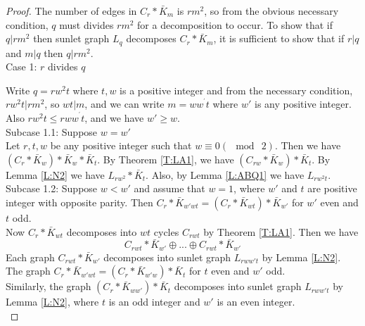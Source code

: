 \documentclass[12pt]{report}
\begin{document}
\begin{proof}
The number of edges in $C_{r}*\bar{K}_{m}$ is $rm^{2}$, so from the
obvious necessary condition, $q$ must divides $rm^{2}$ for a
decomposition to occur. To show that if $q|rm^{2}$ then sunlet graph
$L_{q}$ decomposes $C_{r}*\bar{K}_{m}$, it is sufficient to show
that if $r|q$ and $m|q$ then $q|rm^{2}$. \\
Case 1: $r$ divides $q$

Write $q=rw^{2}t$ where $t,w$ is a positive integer and from the necessary condition, $rw^{2}t|rm^{2}$, so $wt|m$, and we can write $m=ww^{^{\prime }}t$ where $w'$ is any positive integer. Also $%
rw^{2}t\leq rww^{^{\prime }}t$, and we have  $w'\geq w$.\\
Subcase  1.1: Suppose $w=w'$\\%
 Let $r,t,w$ be any positive integer such that $w\equiv 0(\mod \ 2)$. Then we have $(C_r*\bar{K}_w)*\bar{K}_w*\bar{K}_t$. By Theorem \ref{T:LA1}, we have $(C_{rw}*\bar{K}_w)*\bar{K}_t$. By Lemma \ref{L:N2} we have $L_{rw^2}*\bar{K}_t$. Also, by Lemma \ref{L:ABQ1} we have $L_{rw^2t}$.\\
 Subcase 1.2: Suppose $w<w'$ and assume that $w=1$, where $w'$ and $t$ are positive integer with opposite parity. Then $C_r*\bar{K}_{w'wt}=(C_r*\bar{K}_{wt})*\bar{K}_{w'}$ for $w'$ even and $t$ odd.\\
 Now $C_r*\bar{K}_{wt}$ decomposes into $wt$ cycles $C_{rwt}$ by Theorem \ref{T:LA1}. Then we have $$C_{rwt}*\bar{K}_{w'}\oplus...\oplus C_{rwt}*\bar{K}_{w'}$$ Each graph $C_{rwt}*\bar{K}_{w'}$ decomposes into sunlet graph $L_{rww't} $ by Lemma \ref{L:N2}.\\
 The graph $C_r*\bar{K}_{w'wt}=(C_r*\bar{K}_{w'w})*\bar{K}_t$ for $t$ even and $w'$ odd. \\ Similarly, the graph $(C_r*\bar{K}_{ww'})*\bar{K}_t$ decomposes into sunlet graph $L_{rww't}$ by Lemma \ref{L:N2}, where $t$ is an odd integer and $w'$ is an even integer.\\

\end{proof}
\end{document}
